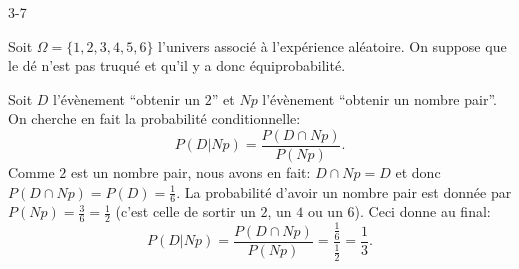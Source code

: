 \begin{corrige}{3-7}

Soit $\Omega = \{ 1, 2, 3, 4, 5, 6 \}$ l'univers associé à l'expérience aléatoire. On suppose que le dé n'est pas truqué et qu'il y a donc équiprobabilité.

Soit $D$ l'évènement ``obtenir un $2$'' et $Np$ l'évènement ``obtenir un nombre pair''. On cherche en fait la probabilité conditionnelle:
\[
 P ( D | Np ) = \frac{P(D \cap Np)}{P(Np)}.
\]
Comme $2$ est un nombre pair, nous avons en fait: $D \cap Np = D$ et donc $P(D \cap Np) = P(D) = \frac16$. La probabilité d'avoir un nombre pair est donnée par $P(Np) = \frac36 = \frac12$ (c'est celle de sortir un $2$, un $4$ ou un $6$).
Ceci donne au final:
\[
 P ( D | Np ) = \frac{P(D \cap Np)}{P(Np)} = \frac{\frac16}{\frac12} = \frac13.
\]


\end{corrige}
